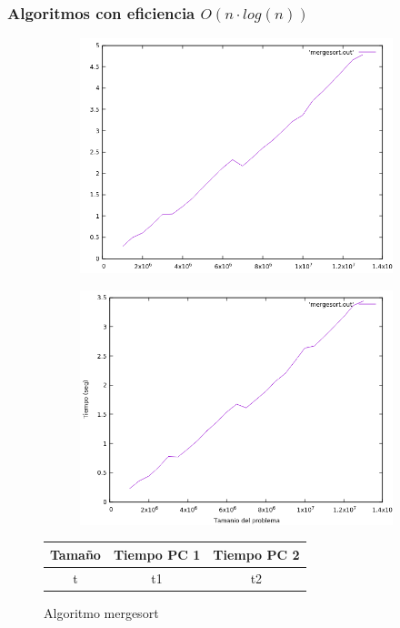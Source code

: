 \documentclass[12pt,spanish]{article}
\begin{document}
\subsubsection{Algoritmos con eficiencia $O(n \cdot log(n))$}

\begin{figure}[H]
\centering
\begin{subfigure}[b]{0.45\textwidth}
\includegraphics[scale=0.45]{empirica_mergesort.png}
\caption{}
\end{subfigure}
\quad
\begin{subfigure}[b]{0.45\textwidth}
\includegraphics[scale=0.45]{empirica_mergesort_2.png}
\caption{}
\end{subfigure}
\begin{tabular}{|c|c|c|}
\hline
\textbf{Tamaño} & \textbf{Tiempo PC 1} & \textbf{Tiempo PC 2} \\
\hline
t & t1 & t2 \\
\hline
\end{tabular}
\caption{Algoritmo mergesort}
\end{figure}
\end{document}
